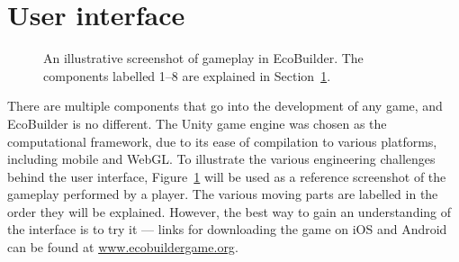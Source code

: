 \section{User interface}
\label{sec:user_interface}
\begin{figure}
    \centering
    \caption[A labelled screenshot of EcoBuilder gameplay]{An illustrative screenshot of gameplay in EcoBuilder. The components labelled 1--8 are explained in Section~\ref{sec:user_interface}.}
    \label{fig:eco_gameplay}
\end{figure}

There are multiple components that go into the development of any game, and EcoBuilder is no different. The Unity game engine \cite{Goldstone2009} was chosen as the computational framework, due to its ease of compilation to various platforms, including mobile and WebGL. To illustrate the various engineering challenges behind the user interface, Figure~\ref{fig:eco_gameplay} will be used as a reference screenshot of the gameplay performed by a player. The various moving parts are labelled in the order they will be explained.
However, the best way to gain an understanding of the interface is to try it --- links for downloading the game on iOS and Android can be found at \url{www.ecobuildergame.org}.

